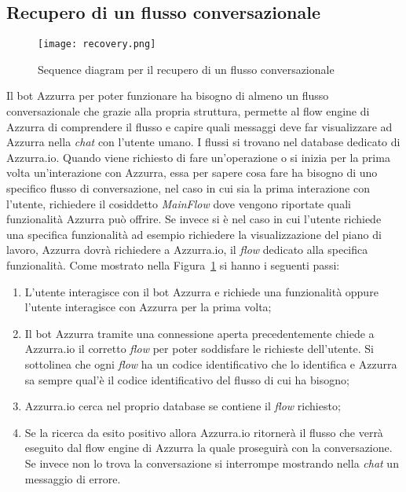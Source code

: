 \subsection{Recupero di un flusso conversazionale}
\begin{figure}[h]
	\begin{center}
		\texttt{[image: recovery.png]}
		\caption{Sequence diagram per il recupero di un flusso conversazionale}\label{fig:recovery}
	\end{center}
\end{figure}
Il \gls{bot}\ap{[g]} Azzurra per poter funzionare ha bisogno di almeno un flusso conversazionale che grazie alla propria struttura, permette al flow engine di Azzurra di comprendere il flusso e capire quali messaggi deve far visualizzare ad Azzurra nella \emph{chat} con l'utente umano. I flussi si trovano nel database dedicato di Azzurra.io. Quando viene richiesto di fare un’operazione o si inizia per la prima volta un'interazione con Azzurra, essa per sapere cosa fare ha bisogno di uno specifico flusso di conversazione, nel caso in cui sia la prima interazione con l'utente, richiedere il cosiddetto \emph{MainFlow} dove vengono riportate quali funzionalità Azzurra può offrire. Se invece si è nel caso in cui l'utente richiede una specifica funzionalità ad esempio richiedere la visualizzazione del piano di lavoro, Azzurra dovrà richiedere a Azzurra.io, il \emph{flow} dedicato alla specifica funzionalità.
Come mostrato nella Figura~\ref{fig:recovery} si hanno i seguenti passi:
\begin{enumerate}
\item L'utente interagisce con il \gls{bot}\ap{[g]} Azzurra e richiede una funzionalità oppure l'utente interagisce con Azzurra per la prima volta;
\item Il \gls{bot}\ap{[g]} Azzurra tramite una connessione aperta precedentemente chiede a Azzurra.io il corretto \emph{flow} per poter soddisfare le richieste dell'utente. Si sottolinea che ogni \emph{flow} ha un codice identificativo che lo identifica e Azzurra sa sempre qual'è il codice identificativo del flusso di cui ha bisogno;
\item Azzurra.io cerca nel proprio database se contiene il \emph{flow} richiesto;
\item Se la ricerca da esito positivo allora Azzurra.io ritornerà il flusso che verrà eseguito dal flow engine di Azzurra la quale proseguirà con la conversazione. Se invece non lo trova la conversazione si interrompe mostrando nella \emph{chat} un messaggio di errore.
\end{enumerate}

